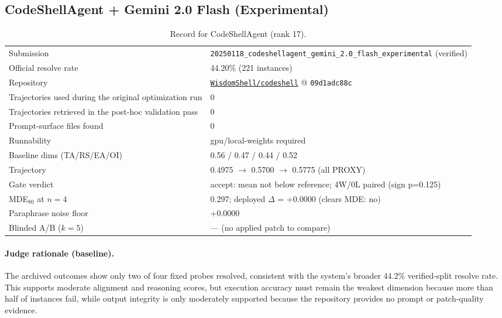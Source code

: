 \subsection{CodeShellAgent + Gemini 2.0 Flash (Experimental)}
\label{app:agent17}
\begin{table}[h]\centering\scriptsize
\caption{Record for CodeShellAgent (rank 17).}
\begin{tabular}{lp{8.2cm}}\toprule
Submission & \texttt{20250118\_\allowbreak{}codeshellagent\_\allowbreak{}gemini\_\allowbreak{}2.0\_\allowbreak{}flash\_\allowbreak{}experimental} (verified) \\
Official resolve rate & 44.20\% (221 instances) \\
Repository & \href{https://github.com/WisdomShell/codeshell}{\texttt{WisdomShell/codeshell}} @ \texttt{09d1adc88c} \\
Trajectories used during the original optimization run & 0 \\
Trajectories retrieved in the post-hoc validation pass & 0 \\
Prompt-surface files found & 0 \\
Runnability & gpu/local-weights required \\
Baseline dims (TA/RS/EA/OI) & 0.56 / 0.47 / 0.44 / 0.52 \\
Trajectory & 0.4975 $\to$ 0.5700 $\to$ 0.5775 (all PROXY) \\
Gate verdict & accept: mean not below reference; 4W/0L paired (sign p=0.125) \\
MDE$_{80}$ at $n{=}4$ & 0.297; deployed $\Delta$ = +0.0000 (clears MDE: no) \\
Paraphrase noise floor & +0.0000 \\
Blinded A/B ($k{=}5$) & --- (no applied patch to compare) \\
\bottomrule\end{tabular}\end{table}
\paragraph{Judge rationale (baseline).}
The archived outcomes show only two of four fixed probes resolved, consistent with the system's broader 44.2\% verified-split resolve rate. This supports moderate alignment and reasoning scores, but execution accuracy must remain the weakest dimension because more than half of instances fail, while output integrity is only moderately supported because the repository provides no prompt or patch-quality evidence.
